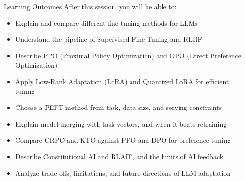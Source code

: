 \begin{frame}[t]{Learning Outcomes}
  After this session, you will be able to:
  \begin{itemize}
    \item[\textcolor{red}{$\blacktriangleright$}] Explain and compare different fine-tuning methods for LLMs
    \item[\textcolor{red}{$\blacktriangleright$}] Understand the pipeline of Supervised Fine-Tuning and RLHF
    \item[\textcolor{red}{$\blacktriangleright$}] Describe PPO (Proximal Policy Optimization) and DPO (Direct Preference Optimization)
    \item[\textcolor{red}{$\blacktriangleright$}] Apply Low-Rank Adaptation (LoRA) and Quantized LoRA for efficient tuning
    \item[\textcolor{red}{$\blacktriangleright$}] Choose a PEFT method from task, data size, and serving constraints
    \item[\textcolor{red}{$\blacktriangleright$}] Explain model merging with task vectors, and when it beats retraining
    \item[\textcolor{red}{$\blacktriangleright$}] Compare ORPO and KTO against PPO and DPO for preference tuning
    \item[\textcolor{red}{$\blacktriangleright$}] Describe Constitutional AI and RLAIF, and the limits of AI feedback
    \item[\textcolor{red}{$\blacktriangleright$}] Analyze trade-offs, limitations, and future directions of LLM adaptation
  \end{itemize}
\end{frame}
